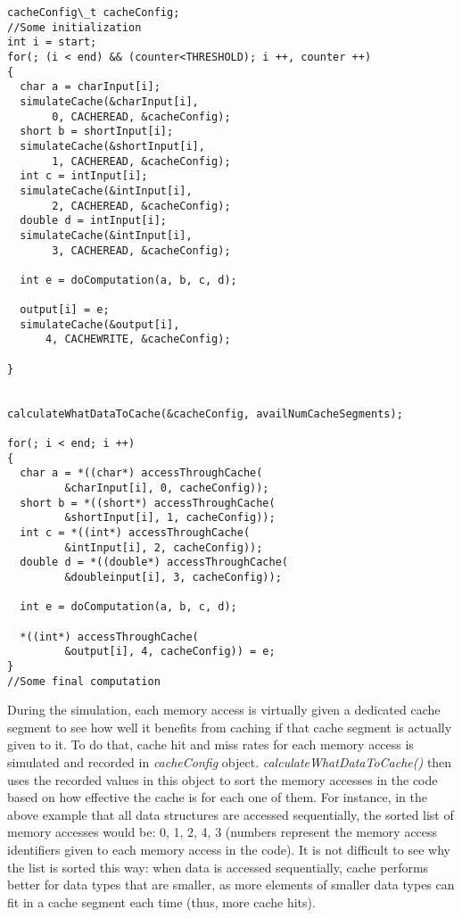 {\footnotesize
\begin{verbatim}
cacheConfig\_t cacheConfig;
//Some initialization
int i = start;
for(; (i < end) && (counter<THRESHOLD); i ++, counter ++)
{
  char a = charInput[i];
  simulateCache(&charInput[i], 
       0, CACHEREAD, &cacheConfig);
  short b = shortInput[i];
  simulateCache(&shortInput[i], 
       1, CACHEREAD, &cacheConfig);
  int c = intInput[i];
  simulateCache(&intInput[i], 
       2, CACHEREAD, &cacheConfig);
  double d = intInput[i];
  simulateCache(&intInput[i], 
       3, CACHEREAD, &cacheConfig);

  int e = doComputation(a, b, c, d);

  output[i] = e;
  simulateCache(&output[i], 
      4, CACHEWRITE, &cacheConfig);

}


calculateWhatDataToCache(&cacheConfig, availNumCacheSegments);

for(; i < end; i ++)
{
  char a = *((char*) accessThroughCache(
         &charInput[i], 0, cacheConfig));
  short b = *((short*) accessThroughCache(
         &shortInput[i], 1, cacheConfig));
  int c = *((int*) accessThroughCache(
         &intInput[i], 2, cacheConfig));
  double d = *((double*) accessThroughCache(
         &doubleinput[i], 3, cacheConfig));

  int e = doComputation(a, b, c, d);

  *((int*) accessThroughCache(
         &output[i], 4, cacheConfig)) = e;
}
//Some final computation
\end{verbatim}
}



During the simulation, each memory access is virtually given a dedicated cache segment to see how well it benefits from
caching if that cache segment is actually given to it. To do that, cache hit and miss rates for each memory access is
simulated and recorded in {\it cacheConfig} object. {\it calculateWhatDataToCache()} then uses the recorded values in
this object to sort the memory accesses in the code based on how effective the cache is for each one of them. For
instance, in the above example that all data structures are accessed sequentially, the sorted list of memory accesses
would be: 0, 1, 2, 4, 3 (numbers represent the memory access identifiers given to each memory access in the code).
It is not difficult to see why the list is sorted this way: when data is accessed sequentially, cache performs better
for data types that are smaller, as more elements of smaller data types can fit in a cache segment each time (thus, more
cache hits).

